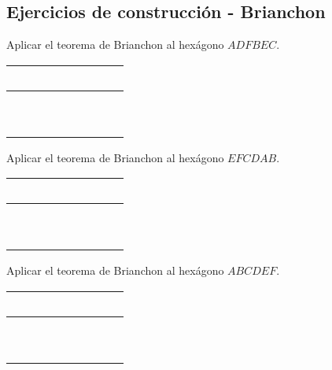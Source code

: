 \newpage
\subsection{Ejercicios de construcción - Brianchon}

\begin{section-exercise}
    Aplicar el teorema de Brianchon al hexágono $ADFBEC$. \hspace{1cm}
    \begin{tabular}{|c|c|c|}
        \hline
        \ \ \ \ && \\\hline
        &\ \ \ \ & \\\hline\hline
        &&\ \ \ \ \\\hline
    \end{tabular}
    \vspace*{\fill}
    \begin{figure}[H]
        \centering
        
    \end{figure}
    \vspace*{\fill}
\end{section-exercise}

\newpage
\begin{section-exercise}
    Aplicar el teorema de Brianchon al hexágono $EFCDAB$. \hspace{1cm}
    \begin{tabular}{|c|c|c|}
        \hline
        \ \ \ \ && \\\hline
        &\ \ \ \ & \\\hline\hline
        &&\ \ \ \ \\\hline
    \end{tabular}
    \vspace*{\fill}
    \begin{figure}[H]
        \centering
        
    \end{figure}
    \vspace*{\fill}
\end{section-exercise}

\newpage
\begin{section-exercise}
    Aplicar el teorema de Brianchon al hexágono $ABCDEF$. \hspace{1cm}
    \begin{tabular}{|c|c|c|}
        \hline
        \ \ \ \ && \\\hline
        &\ \ \ \ & \\\hline\hline
        &&\ \ \ \ \\\hline
    \end{tabular}
    \vspace*{\fill}
    \begin{figure}[H]
        \centering
        
    \end{figure}
    \vspace*{\fill}
\end{section-exercise}

